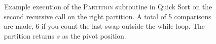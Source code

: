 \begin{figure}
{

}

\caption[Partitioning Example 3]{Example execution of the \textsc{Partition}
subroutine in Quick Sort on the second recursive call on the right partition.  
A total of 5 comparisons are made, 6 if you count the last swap outside the 
while loop.  The partition returns $s$ as the pivot position.}
\label{figure:partitionExample3}

\end{figure}


%

